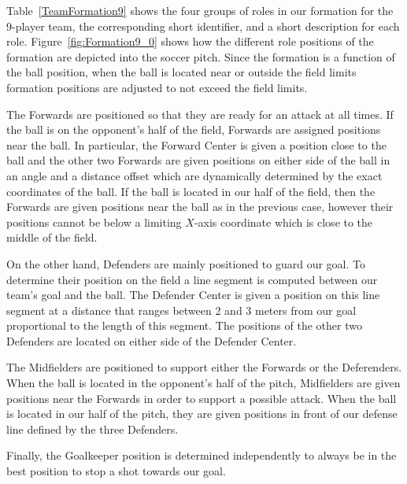 Table~\ref{TeamFormation9} shows the four groups of roles in our formation for the 9-player team, the corresponding short identifier, and a short description for each role. 
Figure~\ref{fig:Formation9_0} shows how the different role positions of the formation are depicted into the soccer pitch. Since the formation is a function of the ball position, when the ball is located near or outside the field limits formation positions are adjusted to not exceed the field limits.



The Forwards are positioned so that they are ready for an attack at all times. If the ball is on the opponent's half of the field, Forwards are assigned positions near the ball. In particular, the Forward Center is given a position close to the ball and the other two Forwards are given positions on either side of the ball in an angle and a distance offset which are dynamically determined by the exact coordinates of the ball. If the ball is located in our half of the field, then the Forwards are given positions near the ball as in the previous case, however their positions cannot be below a limiting $X$-axis coordinate which is close to the middle of the field. 



On the other hand, Defenders are mainly positioned to guard our goal. To determine their position on the field a line segment is computed between our team's goal and the ball. The Defender Center is given a position on this line segment at a distance that ranges between 2 and 3 meters from our goal proportional to the length of this segment. The positions of the other two Defenders are located on either side of the Defender Center. 

The Midfielders are positioned to support either the Forwards or the Deferenders. When the ball is located in the opponent's half of the pitch, Midfielders are given positions near the Forwards in order to support a possible attack. When the ball is located in our half of the pitch, they are given positions in front of our defense line defined by the three Defenders.  

Finally, the Goalkeeper position is determined independently to always be in the best position to stop a shot towards our goal. 

